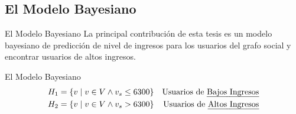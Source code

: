 \documentclass[usenames,dvipsnames,table]{beamer}
\begin{document}
\subsection{El Modelo Bayesiano}

\begin{frame}{El Modelo Bayesiano}
	La principal contribución de esta tesis es un modelo bayesiano de predicción de nivel de ingresos para los usuarios del grafo social y encontrar usuarios de altos ingresos.
\end{frame}

\begin{frame}{El Modelo Bayesiano}
	\begin{align*}
		H_1 &= \left\{ v \mid v \in V \wedge v_s \leq 6300 \right\} &\text{Usuarios de \emph{Bajos Ingresos}} \\
		H_2 &= \left\{ v \mid v \in V \wedge v_s >    6300 \right\} &\text{Usuarios de \emph{Altos Ingresos}}
	\end{align*}
\end{frame}
\end{document}
